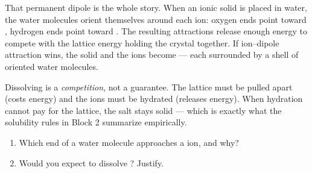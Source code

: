 \documentclass{apchem-notes}
\begin{document}
That permanent dipole is the whole story. When an ionic solid is placed in
water, the water molecules orient themselves around each ion: oxygen ends
point toward , hydrogen ends point toward
. The resulting  attractions
release enough energy to compete with the lattice energy holding the crystal
together. If ion--dipole attraction wins, the solid
 and the ions become  --- each surrounded by
a shell of oriented water molecules.

\begin{center}
\end{center}

\begin{apcnote}
Dissolving is a \emph{competition}, not a guarantee. The lattice must be
pulled apart (costs energy) and the ions must be hydrated (releases energy).
When hydration cannot pay for the lattice, the salt stays solid --- which is
exactly what the solubility rules in Block 2 summarize empirically.
\end{apcnote}


\begin{enumerate}[leftmargin=*,itemsep=0.35em]
  \item Which end of a water molecule approaches a  ion, and why?
  \item Would you expect  to dissolve ? Justify.
\end{enumerate}
\end{document}
